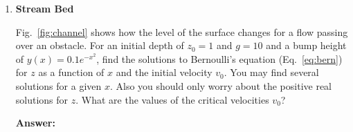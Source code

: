 \documentclass{article}
\newcommand{\dd}[2]{\frac{d {#1}}{d {#2}}}
\begin{document}
\begin{enumerate}


\item{\bf Stream Bed}

  Fig.~\ref{fig:channel} shows how the level of the surface changes
  for a flow passing over an obstacle.  For an initial depth of
  $z_0=1$ and $g=10$ and a bump height of $y(x)=0.1 e^{-x^2}$, find the
  solutions to Bernoulli's equation (Eq.~\ref{eq:bern}) for $z$ as a
  function of $x$ and the initial velocity $v_0$.  You may find
  several solutions for a given $x$.   Also you should only worry
  about the positive real solutions for $z$.  What are the values of
  the critical velocities $v_0$?

{\bf Answer:}


\end{enumerate}
\end{document}
